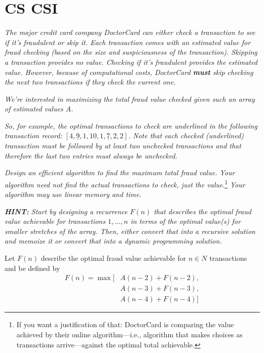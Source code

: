 \documentclass[11pt, oneside]{article}   	%
\theoremstyle{definition}
\theoremstyle{remark}
\begin{document}
\cleardoublepage
\section{CS CSI}
\label{sec-2}

\textit{The major credit card company DoctorCard can either check a transaction to see if it's fraudulent or skip it. Each transaction comes with an estimated value for fraud checking (based on the size and suspiciousness of the transaction). Skipping a transaction provides no value. Checking if it's fraudulent provides the estimated value. However, because of computational costs, DoctorCard \textbf{must} skip checking the next two transactions if they check the current one.}

\textit{We're interested in maximizing the total fraud value checked given such an array of estimated values $A$.}

\textit{So, for example, the optimal transactions to check are underlined in the following transaction record: $[4, \underline{9}, 1, 10, 1, \underline{7}, 2, 2]$. Note that each checked (underlined) transaction must be followed by at least two unchecked transactions and that therefore the last two entries must always be unchecked.}

\textit{Design an efficient algorithm to find the maximum total fraud
value. Your algorithm need not find the actual transactions to check, just the value}.\footnote{If you want a justification of that: DoctorCard is comparing the value achieved by their online algorithm---i.e., algorithm that makes choices as transactions arrive---against the optimal total achievable.} \textit{Your algorithm may use linear memory and time.}

\textit{\textbf{HINT:} Start by designing a recurrence $F(n)$ that describes the optimal fraud value achievable for transactions $1,\ldots,n$ in terms of the optimal value(s) for smaller stretches of the array. Then,
either convert that into a recursive solution and memoize it or convert that into a dynamic programming solution.}

Let $F(n)$ describe the optimal fraud value achievable for $n\in {N}$ transactions and be defined by
\begin{align*}
	F(n) = \max[&A(n-2) + F(n-2), \\
	& A(n-3) + F(n-3), \\
	& A(n-4) + F(n-4)]
\end{align*}
\end{document}
